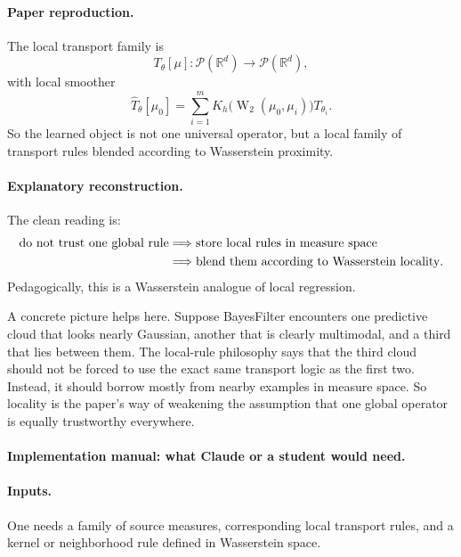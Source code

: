 \documentclass[11pt]{report}
\newcommand{\R}{\mathbb{R}}
\newcommand{\calP}{\mathcal{P}}
\newcommand{\W}{\operatorname{W}}
\begin{document}
\paragraph{Paper reproduction.}
The local transport family is
\begin{equation}
T_\theta[\mu] : \calP(\R^d)\to\calP(\R^d),
\label{eq:girshfeld-local-family}
\end{equation}
with local smoother
\begin{equation}
\widehat T_\theta[\mu_0]
=
\sum_{i=1}^{m} K_h\bigl(\W_2(\mu_0,\mu_i)\bigr)T_{\theta_i}.
\label{eq:girshfeld-local-smoother}
\end{equation}
So the learned object is not one universal operator, but a local family of transport
rules blended according to Wasserstein proximity.

\paragraph{Explanatory reconstruction.}
The clean reading is:
\begin{align}
\text{do not trust one global rule}
&\Longrightarrow
\text{store local rules in measure space}
\notag\\
&\Longrightarrow
\text{blend them according to Wasserstein locality}.
\label{eq:girshfeld-logic}
\end{align}
Pedagogically, this is a Wasserstein analogue of local regression.

A concrete picture helps here.  Suppose BayesFilter encounters one predictive cloud
that looks nearly Gaussian, another that is clearly multimodal, and a third that lies
between them.  The local-rule philosophy says that the third cloud should not be
forced to use the exact same transport logic as the first two.  Instead, it should
borrow mostly from nearby examples in measure space.  So locality is the paper's way
of weakening the assumption that one global operator is equally trustworthy
everywhere.

\paragraph{Implementation manual: what Claude or a student would need.}
\paragraph{Inputs.}
One needs a family of source measures, corresponding local transport rules, and a
kernel or neighborhood rule defined in Wasserstein space.
\end{document}
